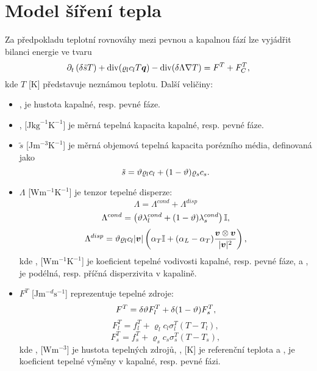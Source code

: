 \section{Model šíření tepla}

Za předpokladu teplotní rovnováhy mezi pevnou a kapalnou fází lze vyjádřit bilanci energie ve tvaru
\[
    \partial_t\left(\delta \tilde s T \right) + \div(\varrho_l c_l T \vc q) - \div(\delta\Lambda\nabla T) = F^T + F^T_C,
\]
kde $T$ [K] představuje neznámou teplotu.
Další veličiny:
\begin{itemize}
\item {},   je hustota kapalné, resp. pevné fáze.
\item {},  [J$\mathrm{kg}^{-1}\mathrm{K}^{-1}$] je měrná tepelná kapacita kapalné, resp. pevné fáze.
\item $\tilde s$ [J$\mathrm{m}^{-3}\mathrm{K}^{-1}$] je měrná objemová tepelná kapacita porézního média, definovaná jako
\[ \tilde s = \hyperA{HeatTransfer-DG-Data::porosity}{\th}\varrho_l c_l + (1-\th)\varrho_s c_s. \]
\item $\Lambda$ [W$\mathrm{m}^{-1}\mathrm{K}^{-1}$] je tenzor tepelné disperze:
\[ \Lambda = \Lambda^{cond} + \Lambda^{disp} \]
\[ \Lambda^{cond} = \left(\th \lambda_l^{cond} + (1-\th)\lambda_s^{cond}\right)\tn I, \]
\[ \Lambda^{disp} = \th \varrho_l c_l|\vc v|\left(\alpha_T\tn I + (\alpha_L-\alpha_T)\frac{\vc v\otimes\vc v}{|\vc v|^2}\right), \]
kde ,  [W$\mathrm{m}^{-1}\mathrm{K}^{-1}$] je koeficient tepelné vodivosti kapalné, resp. pevné fáze, a ,   je podélná, resp. příčná disperzivita v kapalině.

\item $F^T$ [J$\mathrm{m}^{-d}\mathrm{s}^{-1}$] reprezentuje tepelné zdroje:
\[ F^T = \delta \th F^T_l + \delta (1-\th) F^T_s, \]
\[ F^T_l = f_l^T + \varrho_l c_l \sigma^T_l(T-T_l), \]
\[ F^T_s = f_s^T + \varrho_s c_s \sigma^T_s(T-T_s), \]
kde ,  [W$\mathrm{m}^{-3}$] je hustota tepelných zdrojů, ,  [K] je referenční teplota a ,   je koeficient tepelné výměny v kapalné, resp. pevné fázi.
\end{itemize}



